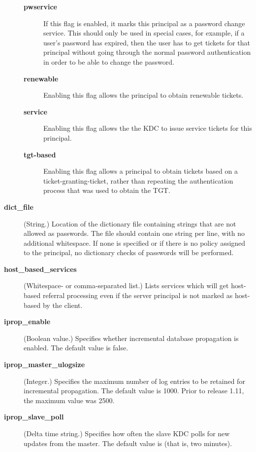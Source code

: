\documentclass[letterpaper,10pt,english]{sphinxmanual}
\begin{document}
\begin{description}
\begin{description}
\item[{\textbf{pwservice}}] \leavevmode
If this flag is enabled, it marks this principal as a password
change service.  This should only be used in special cases,
for example, if a user's password has expired, then the user
has to get tickets for that principal without going through
the normal password authentication in order to be able to
change the password.

\item[{\textbf{renewable}}] \leavevmode
Enabling this flag allows the principal to obtain renewable
tickets.

\item[{\textbf{service}}] \leavevmode
Enabling this flag allows the the KDC to issue service tickets
for this principal.

\item[{\textbf{tgt-based}}] \leavevmode
Enabling this flag allows a principal to obtain tickets based
on a ticket-granting-ticket, rather than repeating the
authentication process that was used to obtain the TGT.

\end{description}

\item[{\textbf{dict\_file}}] \leavevmode
(String.)  Location of the dictionary file containing strings that
are not allowed as passwords.  The file should contain one string
per line, with no additional whitespace.  If none is specified or
if there is no policy assigned to the principal, no dictionary
checks of passwords will be performed.

\item[{\textbf{host\_based\_services}}] \leavevmode
(Whitespace- or comma-separated list.)  Lists services which will
get host-based referral processing even if the server principal is
not marked as host-based by the client.

\item[{\textbf{iprop\_enable}}] \leavevmode
(Boolean value.)  Specifies whether incremental database
propagation is enabled.  The default value is false.

\item[{\textbf{iprop\_master\_ulogsize}}] \leavevmode
(Integer.)  Specifies the maximum number of log entries to be
retained for incremental propagation.  The default value is 1000.
Prior to release 1.11, the maximum value was 2500.

\item[{\textbf{iprop\_slave\_poll}}] \leavevmode
(Delta time string.)  Specifies how often the slave KDC polls for
new updates from the master.  The default value is  (that
is, two minutes).


\end{description}
\end{document}
